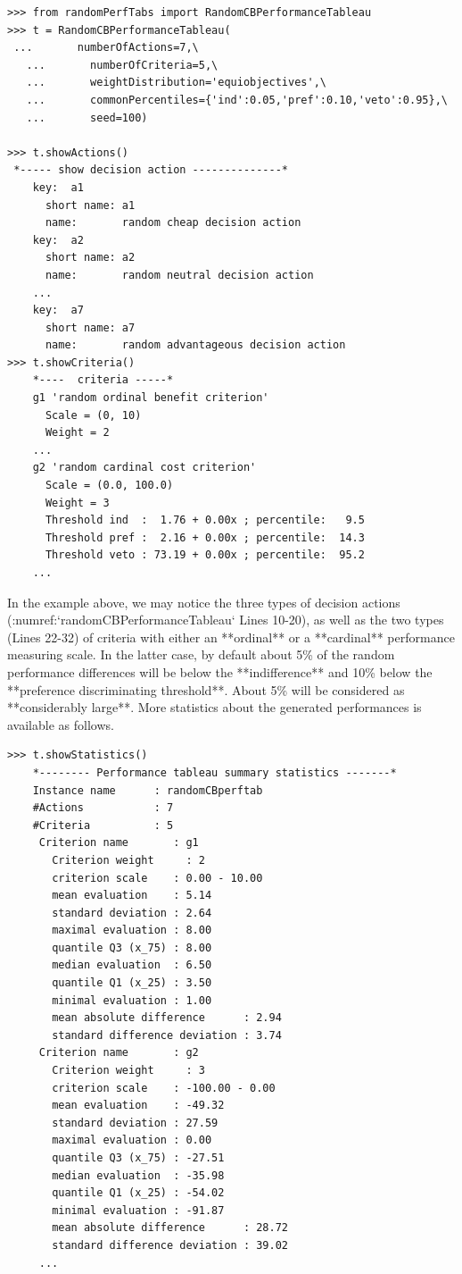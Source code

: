 \begin{lstlisting}[caption={Generating a random Cost-Benefit performance tableau},label=list:5.2,basicstyle=\footnotesize]
>>> from randomPerfTabs import RandomCBPerformanceTableau
>>> t = RandomCBPerformanceTableau(
 ...       numberOfActions=7,\
   ...       numberOfCriteria=5,\
   ...       weightDistribution='equiobjectives',\
   ...       commonPercentiles={'ind':0.05,'pref':0.10,'veto':0.95},\
   ...       seed=100)

>>> t.showActions()
 *----- show decision action --------------*
    key:  a1
      short name: a1
      name:       random cheap decision action
    key:  a2
      short name: a2
      name:       random neutral decision action
    ...
    key:  a7
      short name: a7
      name:       random advantageous decision action
>>> t.showCriteria()
    *----  criteria -----*
    g1 'random ordinal benefit criterion'
      Scale = (0, 10)
      Weight = 2
    ...
    g2 'random cardinal cost criterion'
      Scale = (0.0, 100.0)
      Weight = 3 
      Threshold ind  :  1.76 + 0.00x ; percentile:   9.5
      Threshold pref :  2.16 + 0.00x ; percentile:  14.3
      Threshold veto : 73.19 + 0.00x ; percentile:  95.2
    ...
 \end{lstlisting}

  In the example above, we may notice the three types of decision actions (:numref:`randomCBPerformanceTableau` Lines 10-20), as well as the two types (Lines 22-32) of criteria with either an **ordinal** or a **cardinal** performance measuring scale. In the latter case, by default about 5\% of the random performance differences will be below the **indifference** and 10\% below the **preference discriminating threshold**. About 5\% will be considered as **considerably large**. More statistics about the generated performances is available as follows.

\begin{lstlisting}[basicstyle=\footnotesize]
>>> t.showStatistics()
    *-------- Performance tableau summary statistics -------*
    Instance name      : randomCBperftab
    #Actions           : 7
    #Criteria          : 5
     Criterion name       : g1
       Criterion weight     : 2
       criterion scale    : 0.00 - 10.00
       mean evaluation    : 5.14
       standard deviation : 2.64
       maximal evaluation : 8.00
       quantile Q3 (x_75) : 8.00
       median evaluation  : 6.50
       quantile Q1 (x_25) : 3.50
       minimal evaluation : 1.00
       mean absolute difference      : 2.94
       standard difference deviation : 3.74
     Criterion name       : g2
       Criterion weight     : 3
       criterion scale    : -100.00 - 0.00
       mean evaluation    : -49.32
       standard deviation : 27.59
       maximal evaluation : 0.00
       quantile Q3 (x_75) : -27.51
       median evaluation  : -35.98
       quantile Q1 (x_25) : -54.02
       minimal evaluation : -91.87
       mean absolute difference      : 28.72
       standard difference deviation : 39.02
     ...
\end{lstlisting}

